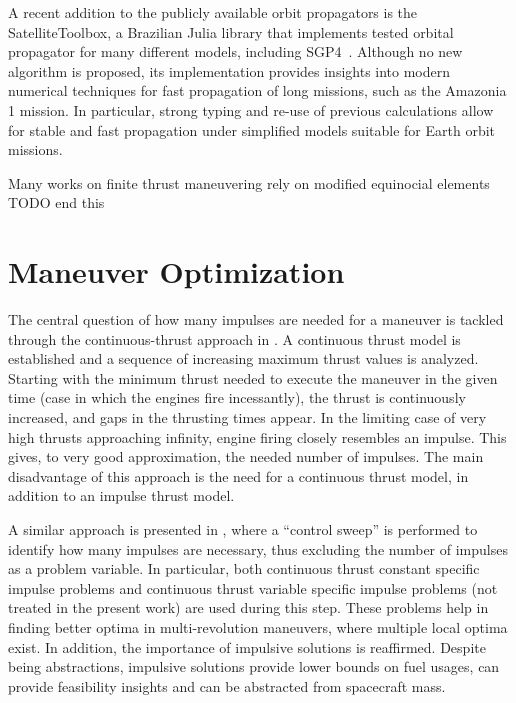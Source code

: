 A recent addition to the publicly available orbit propagators is the SatelliteToolbox, a Brazilian Julia library that implements tested orbital propagator for many different models, including SGP4~\cite{satellitetoolbox}. Although no new algorithm is proposed, its implementation provides insights into modern numerical techniques for fast propagation of long missions, such as the Amazonia 1 mission. In particular, strong typing and re-use of previous calculations allow for stable and fast propagation under simplified models suitable for Earth orbit missions.\

Many works on finite thrust maneuvering rely on modified equinocial elements TODO end this

\section{Maneuver Optimization}

The central question of how many impulses are needed for a maneuver is tackled through the continuous-thrust approach in . A continuous thrust model is established and a sequence of increasing maximum thrust values is analyzed. Starting with the minimum thrust needed to execute the maneuver in the given time (case in which the engines fire incessantly), the thrust is continuously increased, and gaps in the thrusting times appear. In the limiting case of very high thrusts approaching infinity, engine firing closely resembles an impulse. This gives, to very good approximation, the needed number of impulses. The main disadvantage of this approach is the need for a continuous thrust model, in addition to an impulse thrust model. 

A similar approach is presented in , where a ``control sweep'' is performed to identify how many impulses are necessary, thus excluding the number of impulses as a problem variable. In particular, both continuous thrust constant specific impulse problems and continuous thrust variable specific impulse problems (not treated in the present work) are used during this step. These problems help in finding better optima in multi-revolution maneuvers, where multiple local optima exist. In addition, the importance of impulsive solutions is reaffirmed. Despite being abstractions, impulsive solutions provide lower bounds on fuel usages, can provide feasibility insights and can be abstracted from spacecraft mass.

